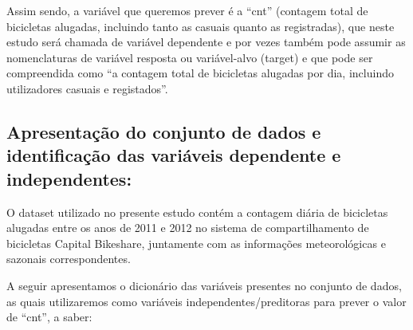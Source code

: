 \documentclass[
  letterpaper,
  DIV=11,
  numbers=noendperiod]{scrartcl}
\begin{document}
Assim sendo, a variável que queremos prever é a ``cnt'' (contagem total
de bicicletas alugadas, incluindo tanto as casuais quanto as
registradas), que neste estudo será chamada de variável dependente e por
vezes também pode assumir as nomenclaturas de variável resposta ou
variável-alvo (target) e que pode ser compreendida como ``a contagem
total de bicicletas alugadas por dia, incluindo utilizadores casuais e
registados''.

\subsection{Apresentação do conjunto de dados e identificação das
variáveis dependente e
independentes:}\label{apresentauxe7uxe3o-do-conjunto-de-dados-e-identificauxe7uxe3o-das-variuxe1veis-dependente-e-independentes}

O dataset utilizado no presente estudo contém a contagem diária de
bicicletas alugadas entre os anos de 2011 e 2012 no sistema de
compartilhamento de bicicletas Capital Bikeshare, juntamente com as
informações meteorológicas e sazonais correspondentes.

A seguir apresentamos o dicionário das variáveis presentes no conjunto
de dados, as quais utilizaremos como variáveis independentes/preditoras
para prever o valor de ``cnt'', a saber:
\end{document}
